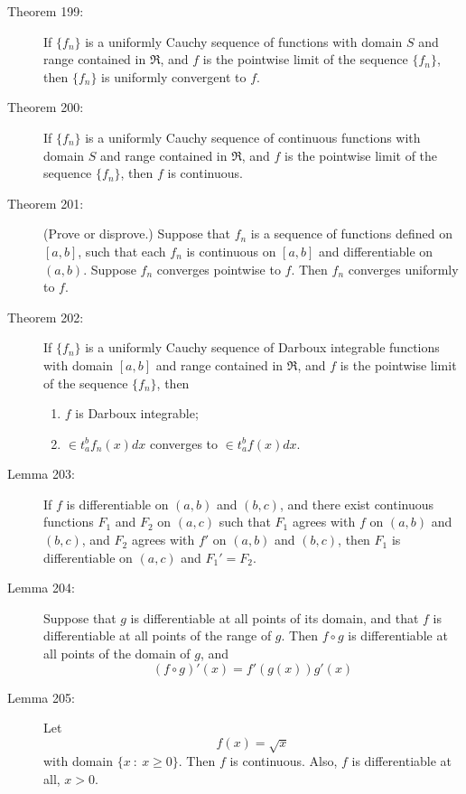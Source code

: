 \documentclass{article}
\begin{document}
\begin{description}
  \item[Theorem 199:] If $\{ f_{n} \}$ is a uniformly Cauchy sequence of functions with domain $S$ and range contained in $\Re$, and $f$ is the pointwise limit of the sequence $\{ f_{n} \}$, then $\{ f_{n} \}$ is uniformly convergent to $f$. 

  \item[Theorem 200:] If $\{ f_{n} \}$ is a uniformly Cauchy sequence of continuous functions with domain $S$ and range contained in $\Re$, and $f$ is the pointwise limit of the sequence $\{ f_{n} \}$, then $f$ is continuous. 

  \item[Theorem 201:] (Prove or disprove.) Suppose that $f_{n}$ is a sequence of functions defined on $[a,b]$, such that each $f_{n}$ is continuous on $[a,b]$ and differentiable on $(a,b)$. Suppose $f_{n}$ converges pointwise to $f$. Then $f_{n}$ converges uniformly to $f$. 

  \item[Theorem 202:] If $\{ f_{n} \}$ is a uniformly Cauchy sequence of Darboux integrable functions with domain $[a,b]$ and range contained in $\Re$, and $f$ is the pointwise limit of the sequence $\{ f_{n} \}$, then
    \begin{enumerate}[\hspace{1cm}1.]
      \item $f$ is Darboux integrable;
      \item $\in t_{a}^{b} f_{n}(x) dx$ converges to $\in t_{a}^{b} f(x) dx$. 
    \end{enumerate}

  \item[Lemma 203:] If $f$ is differentiable on $(a,b)$ and $(b,c)$, and there exist continuous functions $F_{1}$ and $F_{2}$ on $(a,c)$ such that $F_{1}$ agrees with $f$ on $(a,b)$ and $(b,c)$, and $F_{2}$ agrees with $f'$ on $(a,b)$ and $(b,c)$, then $F_{1}$ is differentiable on $(a,c)$ and $F_{1}' = F_{2}$. 

  \item[Lemma 204:] Suppose that $g$ is differentiable at all points of its domain, and that $f$ is differentiable at all points of the range of $g$. Then $f \circ g$ is differentiable at all points of the domain of $g$, and
    \begin{equation*}
    (f \circ g)' (x) = f' (g(x)) g' (x)
    \end{equation*}

  \item[Lemma 205:] Let
    \begin{equation*}
    f(x) = \sqrt{x}
    \end{equation*}
    with domain $\{ x\ :\ x \geq 0 \}$. Then $f$ is continuous. Also, $f$ is differentiable at all, $x > 0$.


\end{description}
\end{document}
